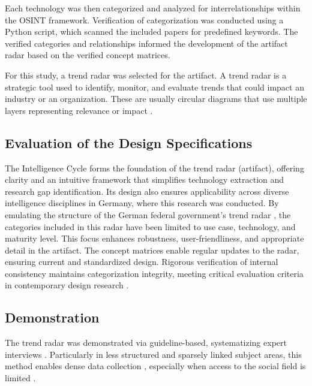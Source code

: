 \documentclass[10pt]{article}
\begin{document}

Each technology was then categorized and analyzed for interrelationships within the OSINT framework. Verification of categorization was conducted using a Python script, which scanned the included papers for predefined keywords. The verified categories and relationships informed the development of the artifact radar based on the verified concept matrices.

For this study, a trend radar was selected for the artifact. A trend radar is a strategic tool used to identify, monitor, and evaluate trends that could impact an industry or an organization. These are usually circular diagrams that use multiple layers representing relevance or impact \cite{wulfmettbrenn2017}.

\subsection{Evaluation of the Design Specifications}
The Intelligence Cycle forms the foundation of the trend radar (artifact), offering clarity and an intuitive framework that simplifies technology extraction and research gap identification. Its design also ensures applicability across diverse intelligence disciplines in Germany, where this research was conducted. By emulating the structure of the German federal government's trend radar \cite{Stich.2022}, the categories included in this radar have been limited to use case, technology, and maturity level. This focus enhances robustness, user-friendliness, and appropriate detail in the artifact. The concept matrices enable regular updates to the radar, ensuring current and standardized design. Rigorous verification of internal consistency maintains categorization integrity, meeting critical evaluation criteria in contemporary design research \cite{vomBrocke.2020b}.


\subsection{Demonstration}
The trend radar was demonstrated via guideline-based, systematizing expert interviews \cite{Bogner.2014, Glaser.2009, Meuser.1991}. Particularly in less structured and sparsely linked subject areas, this method enables dense data collection \cite{Bogner.2014, Meuser.1991}, especially when access to the social field is limited \cite{Bogner.2002c, Glaser.2009}.
\end{document}

